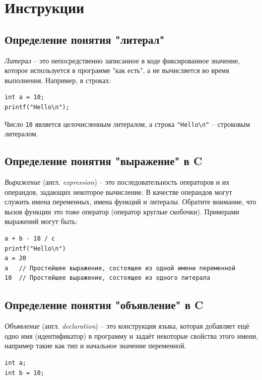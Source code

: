 \documentclass[10pt]{article}
\begin{document}
\newpage

\section*{Инструкции}
\subsection*{Определение понятия "литерал"{}}
\textit{Литерал} -- это непосредственно записанное в коде фиксированное значение, которое используется в программе "как есть"{}, а не вычисляется во время выполнения. Например, в строках:
\begin{lstlisting}
int a = 10;
printf("Hello\n");
\end{lstlisting}
Число \texttt{10} является целочисленным литералом, а строка \texttt{"Hello\textbackslash n"} -- строковым литералом.

\subsection*{Определение понятия "выражение"{} в C}
\textit{Выражение} (англ. \textit{expression}) -- это последовательность операторов и их операндов, задающих некоторое вычисление. В качестве операндов могут служить имена переменных, имена функций и литералы. Обратите внимание, что вызов функции это тоже оператор (оператор круглые скобочки). Примерами выражений могут быть:
\begin{lstlisting}
a + b - 10 / c
printf("Hello\n")
a = 20
a  	// Простейшее выражение, состоящее из одной имени переменной
10  // Простейшее выражение, состоящее из одного литерала
\end{lstlisting}


\subsection*{Определение понятия "объявление"{} в C}
\textit{Объявление} (англ. \textit{declaration}) -- это конструкция языка, которая добавляет ещё одно имя (идентификатор) в программу и задаёт некоторые свойства этого имени, например такие как тип и начальное значение переменной.
\begin{lstlisting}
int a;
int b = 10;
\end{lstlisting}
\end{document}

